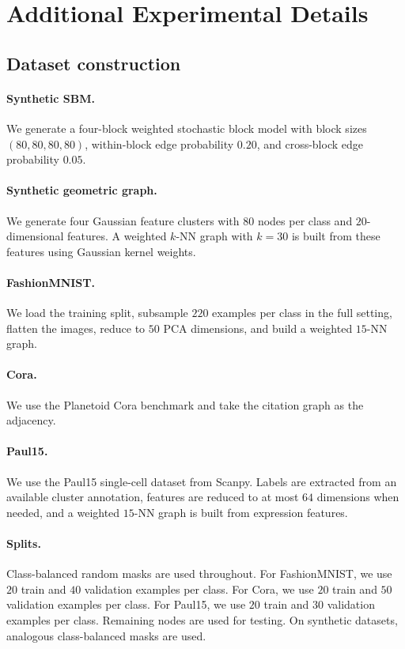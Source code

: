 \documentclass{article}
\begin{document}
\section{Additional Experimental Details}
\label{app:experiments}

\subsection{Dataset construction}
\label{app:datasets}

\paragraph{Synthetic SBM.}
We generate a four-block weighted stochastic block model with block sizes \((80,80,80,80)\), within-block edge probability \(0.20\), and cross-block edge probability \(0.05\).

\paragraph{Synthetic geometric graph.}
We generate four Gaussian feature clusters with \(80\) nodes per class and \(20\)-dimensional features. A weighted \(k\)-NN graph with \(k=30\) is built from these features using Gaussian kernel weights.

\paragraph{FashionMNIST.}
We load the training split, subsample $220$ examples per class in the full setting, flatten the images, reduce to $50$ PCA dimensions, and build a weighted $15$-NN graph.

\paragraph{Cora.}
We use the Planetoid Cora benchmark and take the citation graph as the adjacency.

\paragraph{Paul15.}
We use the Paul15 single-cell dataset from Scanpy. Labels are extracted from an available cluster annotation, features are reduced to at most $64$ dimensions when needed, and a weighted $15$-NN graph is built from expression features.

\paragraph{Splits.}
Class-balanced random masks are used throughout. For FashionMNIST, we use $20$ train and $40$ validation examples per class. For Cora, we use $20$ train and $50$ validation examples per class. For Paul15, we use $20$ train and $30$ validation examples per class. Remaining nodes are used for testing. On synthetic datasets, analogous class-balanced masks are used.
\end{document}
